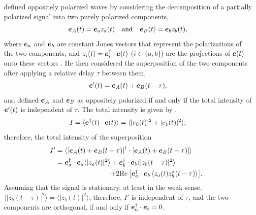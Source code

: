 \cite{sto52} defined oppositely polarized waves by considering the decomposition of a partially polarized signal into two purely polarized components,
%
\begin{equation}
 \mbox{\boldmath $e$}_A(t) = \mbox{\boldmath $e$}_a z_a(t) \quad \text{and} \quad \mbox{\boldmath $e$}_B(t) = \mbox{\boldmath $e$}_b z_b(t),
\end{equation}
%
where $\mbox{\boldmath $e$}_a$ and $\mbox{\boldmath $e$}_b$ are constant Jones vectors that represent the polarizations of the two components,
and $z_i(t) = \mbox{\boldmath $e$}_i^\dagger \cdot \mbox{\boldmath $e$}(t)$ ($i \in \{a,b\}$)
are the projections of $\mbox{\boldmath $e$}(t)$ onto these vectors .
%
He then considered the superposition of the two components after applying a relative delay  $\tau$ between them,
%
\begin{equation}
    \mbox{\boldmath $e$}'(t) = \mbox{\boldmath $e$}_A(t) + \mbox{\boldmath $e$}_B(t-\tau),
\end{equation}
%
and defined $\mbox{\boldmath $e$}_A$ and $\mbox{\boldmath $e$}_B$ as oppositely polarized if and only if the total intensity of $\mbox{\boldmath $e$}'(t)$ is independent of $\tau$.
%
The total intensity is given by ,
%
\begin{equation}
    I = \langle \mbox{\boldmath $e$}^\dagger(t) \cdot \mbox{\boldmath $e$}(t) \rangle 
        = \langle |e_0(t)|^2 + |e_1(t)|^2 \rangle;
\end{equation}
%
therefore, the total intensity of the superposition
%
\begin{equation} \begin{split}
I' &= \langle \left[\Jcol{e}_A(t) + \Jcol{e}_B(t-\tau)\right]^\dagger \cdot \left[\Jcol{e}_A(t)+ \Jcol{e}_B(t-\tau)\right] \rangle \\
&= \Jcol{e}_a^\dagger \cdot \Jcol{e}_a \langle |z_a(t)|^2 \rangle 
 + \Jcol{e}_b^\dagger \cdot \Jcol{e}_b \langle |z_b(t-\tau)|^2 \rangle \\
& \omit\hfill\ensuremath{ \qquad\qquad\qquad\qquad + 2 \re{\Jcol{e}_a^\dagger \cdot \Jcol{e}_b \, \langle z_a(t) z_b^*(t-\tau) \rangle} }.
\end{split} \end{equation}
%
Assuming that the signal is stationary, at least in the weak sense, $\langle |z_b(t-\tau)|^2 \rangle = \langle |z_b(t)|^2 \rangle$; therefore, $I'$ is independent of $\tau$, and the two components are orthogonal, if and only if $\mbox{\boldmath $e$}_a^\dagger \cdot \mbox{\boldmath $e$}_b = 0$.

